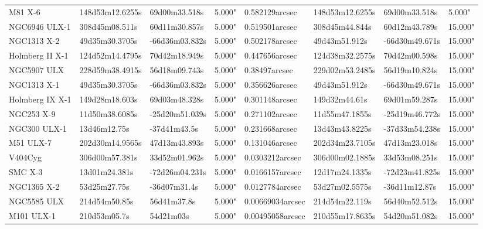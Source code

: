 \begin{tabular}{llllllll}
           M81 X-6 & 148d53m12.6255s &  69d00m33.518s &       5.000" &            0.582129arcsec & 148d53m12.6255s &  69d00m33.518s &     5.000" \\
     NGC6946 ULX-1 &  308d45m08.511s &  60d11m30.857s &       5.000" &            0.519501arcsec &  308d45m44.844s &  60d12m43.789s &    15.000" \\
       NGC1313 X-2 &  49d35m30.3705s & -66d36m03.832s &       5.000" &            0.502178arcsec &   49d43m51.912s & -66d30m49.671s &    15.000" \\
   Holmberg II X-1 & 124d52m14.4795s &  70d42m18.949s &       5.000" &            0.447656arcsec & 124d38m32.2575s &  70d42m00.598s &    15.000" \\
       NGC5907 ULX & 228d59m38.4915s &  56d18m09.743s &       5.000" &             0.38497arcsec & 229d02m53.2485s &  56d19m10.824s &    15.000" \\
       NGC1313 X-1 &  49d35m30.3705s & -66d36m03.832s &       5.000" &            0.356626arcsec &   49d43m51.912s & -66d30m49.671s &    15.000" \\
   Holmberg IX X-1 &  149d28m18.603s &  69d03m48.328s &       5.000" &            0.301148arcsec &   149d32m44.61s &  69d01m59.287s &    15.000" \\
        NGC253 X-9 &  11d50m38.6085s & -25d20m51.039s &       5.000" &            0.271102arcsec &  11d55m47.1855s & -25d19m46.772s &    15.000" \\
      NGC300 ULX-1 &    13d46m12.75s &   -37d41m43.5s &       5.000" &            0.231668arcsec &  13d43m43.8225s & -37d33m54.238s &    15.000" \\
         M51 ULX-7 & 202d30m14.9565s &  47d13m43.893s &       5.000" &            0.131046arcsec & 202d34m23.7105s &  47d13m23.018s &    15.000" \\
           V404Cyg &  306d00m57.381s &  33d52m01.962s &       5.000" &           0.0303212arcsec & 306d00m02.1885s &  33d53m08.251s &    15.000" \\
           SMC X-3 &   13d01m24.381s & -72d26m04.231s &       5.000" &           0.0166157arcsec &  12d17m24.1335s & -72d23m41.825s &    15.000" \\
       NGC1365 X-2 &    53d25m27.75s &   -36d07m31.4s &       5.000" &           0.0127784arcsec &  53d27m02.5575s &  -36d11m12.87s &    15.000" \\
       NGC5585 ULX &   214d54m50.85s &    56d41m37.8s &       5.000" &          0.00669034arcsec &  214d54m22.119s &  56d40m52.512s &    15.000" \\
        M101 ULX-1 &    210d53m05.7s &      54d21m03s &       5.000" &          0.00495058arcsec & 210d55m17.8635s &  54d20m51.082s &    15.000" \\
\bottomrule
\end{tabular}
